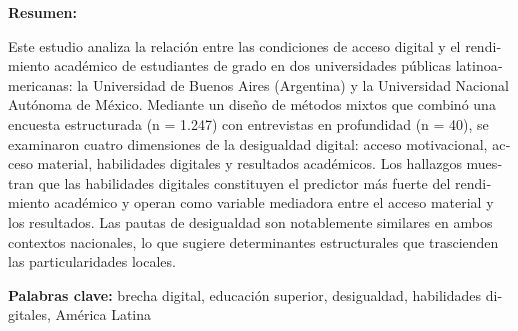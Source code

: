 \begin{tcolorbox}[colback=brown!8!white,colframe=brown!8!white,boxrule=0pt,arc=2pt,left=4pt,right=4pt,top=3pt,bottom=3pt,before skip=4pt,after skip=4pt]
\begin{otherlanguage}{spanish}
\sffamily\small \textbf{Resumen:} 
     
     Este estudio analiza la relación entre las condiciones de acceso digital y el rendimiento académico de estudiantes de grado en dos universidades públicas latinoamericanas: la Universidad de Buenos Aires (Argentina) y la Universidad Nacional Autónoma de México. Mediante un diseño de métodos mixtos que combinó una encuesta estructurada (n = 1.247) con entrevistas en profundidad (n = 40), se examinaron cuatro dimensiones de la desigualdad digital: acceso motivacional, acceso material, habilidades digitales y resultados académicos. Los hallazgos muestran que las habilidades digitales constituyen el predictor más fuerte del rendimiento académico y operan como variable mediadora entre el acceso material y los resultados. Las pautas de desigualdad son notablemente similares en ambos contextos nacionales, lo que sugiere determinantes estructurales que trascienden las particularidades locales.
    
    
\par\smallskip\noindent\textbf{Palabras clave:} brecha digital, educación superior, desigualdad, habilidades digitales, América Latina
\end{otherlanguage}
\end{tcolorbox}

